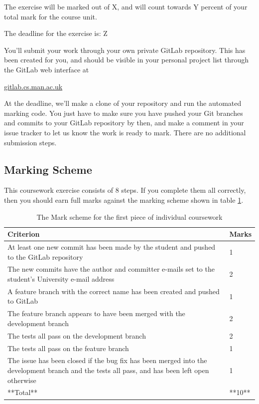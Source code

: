 \documentclass[
]{book}
\begin{document}
The exercise will be marked out of X, and will count towards Y percent of your total mark for the course unit.

The deadline for the exercise is: Z

You'll submit your work through your own private GitLab repository. This has been created for you, and should be visible in your personal project list through the GitLab web interface at

\href{https://gitlab.cs.man.ac.uk}{gitlab.cs.man.ac.uk}

At the deadline, we'll make a clone of your repository and run the automated marking code. You just have to make sure you have pushed your Git branches and commits to your GitLab repository by then, and make a comment in your issue tracker to let us know the work is ready to mark. There are no additional submission steps.

\hypertarget{markingscheme}{%
\subsection{Marking Scheme}\label{markingscheme}}

This coursework exercise consists of 8 steps. If you complete them all correctly, then you should earn full marks against the marking scheme shown in table \ref{tab:marktable}.

\begin{table}

\caption{\label{tab:marktable}The Mark scheme for the first piece of individual coursework}
\centering
\begin{tabular}[t]{ll}
\toprule
Criterion & Marks\\
\midrule
At least one new commit has been made by the student and pushed to the GitLab repository & 1\\
The new commits have the author and committer e-mails set to the student's University e-mail address & 2\\
A feature branch with the correct name has been created and pushed to GitLab & 1\\
The feature branch appears to have been merged with the development branch & 2\\
The tests all pass on the development branch & 2\\
\addlinespace
The tests all pass on the feature branch & 1\\
The issue has been closed if the bug fix has been merged into the development branch and the tests all pass, and has been left open otherwise & 1\\
**Total** & **10**\\
\bottomrule
\end{tabular}
\end{table}
\end{document}
